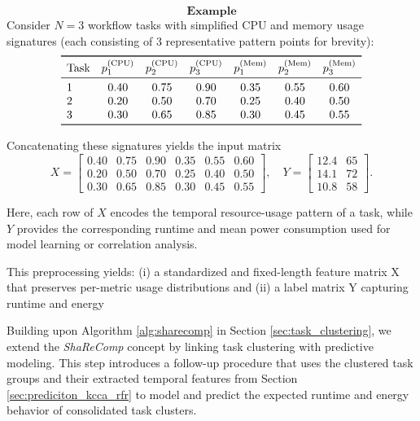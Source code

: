 \[
    \textbf{Example}
\]
Consider \( N = 3 \) workflow tasks with simplified
CPU and memory usage signatures
(each consisting of 3 representative pattern points for brevity):
\[
    \begin{array}{lcccccc}
        \toprule
        \text{Task}        &
        p_1^{(\text{CPU})} & p_2^{(\text{CPU})} & p_3^{(\text{CPU})} &
        p_1^{(\text{Mem})} & p_2^{(\text{Mem})} & p_3^{(\text{Mem})}                             \\
        \midrule
        1                  & 0.40               & 0.75               & 0.90 & 0.35 & 0.55 & 0.60 \\
        2                  & 0.20               & 0.50               & 0.70 & 0.25 & 0.40 & 0.50 \\
        3                  & 0.30               & 0.65               & 0.85 & 0.30 & 0.45 & 0.55 \\
        \bottomrule
    \end{array}
\]

Concatenating these signatures yields the input matrix
\[
    X =
    \begin{bmatrix}
        0.40 & 0.75 & 0.90 & 0.35 & 0.55 & 0.60 \\
        0.20 & 0.50 & 0.70 & 0.25 & 0.40 & 0.50 \\
        0.30 & 0.65 & 0.85 & 0.30 & 0.45 & 0.55
    \end{bmatrix},
    \quad
    Y =
    \begin{bmatrix}
        12.4 & 65 \\
        14.1 & 72 \\
        10.8 & 58
    \end{bmatrix}.
\]

Here, each row of \( X \) encodes the temporal resource-usage pattern
of a task, while \( Y \) provides the corresponding runtime and mean
power consumption used for model learning or correlation analysis.

This preprocessing yields: (i) a standardized and fixed-length feature matrix X that preserves per-metric usage distributions and (ii) a label matrix Y capturing runtime and energy

Building upon Algorithm \ref{alg:sharecomp} in Section \ref{sec:task_clustering}, we extend the \textit{ShaReComp} concept by linking task clustering with predictive modeling. This step introduces a follow-up procedure that uses the clustered task groups and their extracted temporal features from Section \ref{sec:prediciton_kcca_rfr} to model and predict the expected runtime and energy behavior of consolidated task clusters.

